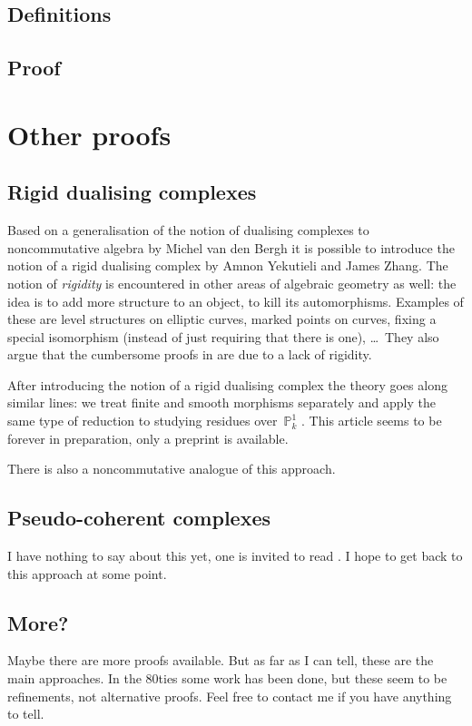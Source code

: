 \documentclass[10pt,a4paper]{article}
\begin{document}
\subsection{Definitions}
\label{subsection:definitions}

\subsection{Proof}
\label{subsection:proof}

\section{Other proofs}
\label{section:other}
\subsection{Rigid dualising complexes}
\label{subsection:yekutieli-zhang}
Based on a generalisation of the notion of dualising complexes to noncommutative algebra \cite{van-den-bergh-dualizing-complexes} by Michel van den Bergh it is possible to introduce the notion of a rigid dualising complex \cite{yekutieli-zhang-rigid-dualizing-complexes} by Amnon Yekutieli and James Zhang. The notion of \emph{rigidity} is encountered in other areas of algebraic geometry as well: the idea is to add more structure to an object, to kill its automorphisms. Examples of these are level structures on elliptic curves, marked points on curves, fixing a special isomorphism (instead of just requiring that there is one), \ldots\ They also argue that the cumbersome proofs in \cite{hartshorne-residues-and-duality} are due to a lack of rigidity.

After introducing the notion of a rigid dualising complex the theory goes along similar lines: we treat finite and smooth morphisms separately and apply the same type of reduction to studying residues over~$\mathbb{P}_k^1$ \cite{yekutieli-zhang-rigid-dualizing-complexes-on-schemes}. This article seems to be forever in preparation, only a preprint is available.

There is also a noncommutative analogue of this approach.

\subsection{Pseudo-coherent complexes}
\label{subsection:lipman}
I have nothing to say about this yet, one is invited to read \cite{lipman-notes-on-grothendieck-duality}. I hope to get back to this approach at some point.

\subsection{More?}
Maybe there are more proofs available. But as far as I can tell, these are the main approaches. In the 80ties some work has been done, but these seem to be refinements, not alternative proofs. Feel free to contact me if you have anything to tell.


\printbibliography
\end{document}
